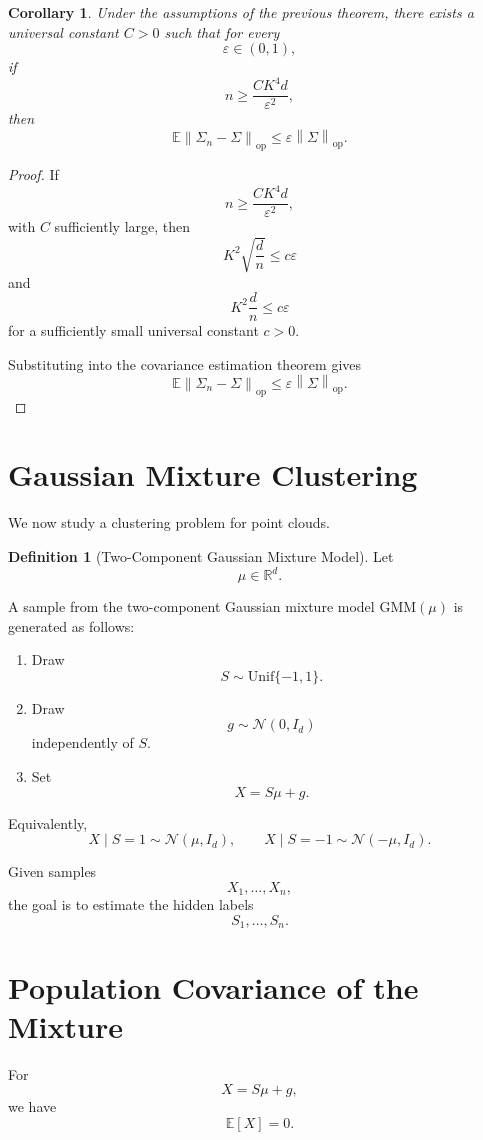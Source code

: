 \documentclass[12pt,oneside]{book}
\numberwithin{equation}{section}
\theoremstyle{definition}
\newtheorem{definition}{Definition}[section]
\theoremstyle{plain}
\newtheorem{corollary}{Corollary}[section]
\theoremstyle{remark}
\newcommand{\R}{\mathbb{R}}
\newcommand{\E}{\mathbb{E}}
\newcommand{\norm}[1]{\left\lVert #1 \right\rVert}
\newcommand{\Normal}{\mathcal{N}}
\begin{document}
\begin{corollary}
Under the assumptions of the previous theorem, there exists a universal constant $C>0$ such that for every
\[
\varepsilon\in(0,1),
\]
if
\[
n
\geq
\frac{CK^4d}{\varepsilon^2},
\]
then
\[
\E\norm{\Sigma_n-\Sigma}_{\mathrm{op}}
\leq
\varepsilon\norm{\Sigma}_{\mathrm{op}}.
\]
\end{corollary}

\begin{proof}
If
\[
n
\geq
\frac{CK^4d}{\varepsilon^2},
\]
with $C$ sufficiently large, then
\[
K^2\sqrt{\frac{d}{n}}
\leq
c\varepsilon
\]
and
\[
K^2\frac{d}{n}
\leq
c\varepsilon
\]
for a sufficiently small universal constant $c>0$.

Substituting into the covariance estimation theorem gives
\[
\E\norm{\Sigma_n-\Sigma}_{\mathrm{op}}
\leq
\varepsilon\norm{\Sigma}_{\mathrm{op}}.
\]
\end{proof}

\section{Gaussian Mixture Clustering}

We now study a clustering problem for point clouds.

\begin{definition}[Two-Component Gaussian Mixture Model]
Let
\[
\mu\in\R^d.
\]

A sample from the two-component Gaussian mixture model $\mathrm{GMM}(\mu)$ is generated as follows:
\begin{enumerate}
\item Draw
\[
S\sim \mathrm{Unif}\{-1,1\}.
\]
\item Draw
\[
g\sim \Normal(0,I_d)
\]
independently of $S$.
\item Set
\[
X=S\mu+g.
\]
\end{enumerate}
\end{definition}

Equivalently,
\[
X\mid S=1\sim \Normal(\mu,I_d),
\qquad
X\mid S=-1\sim \Normal(-\mu,I_d).
\]

Given samples
\[
X_1,\dots,X_n,
\]
the goal is to estimate the hidden labels
\[
S_1,\dots,S_n.
\]

\section{Population Covariance of the Mixture}

For
\[
X=S\mu+g,
\]
we have
\[
\E[X]=0.
\]
\end{document}
